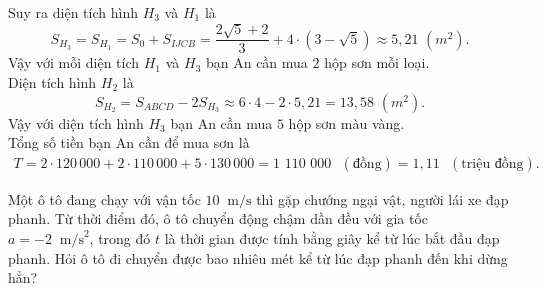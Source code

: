\begin{bt}
{		Suy ra diện tích  hình $H_3$ và $H_1$ là\\
		 $$S_{H_3}=S_{H_1}=S_0+S_{IJCB}=\dfrac{2\sqrt{5}+2}{3}+4\cdot \left(3-\sqrt{5} \right)\approx 5{,}21\,\,(m^2).$$
		Vậy với mỗi diện tích $H_1$  và $H_3$ bạn An cần mua $2$ hộp sơn mỗi loại.\\
		Diện tích  hình $H_2$ là
		$$S_{H_2}=S_{ABCD}-2S_{H_3}\approx 6\cdot4-2\cdot 5{,}21=13{,}58\,\,(m^2).$$ 
		Vậy với diện tích hình $H_3$ bạn An cần mua  $5$ hộp sơn màu vàng.\\
		Tổng số tiền bạn An cần để  mua sơn là
		\begin{align*}
			T=2\cdot 120\,000 + 2\cdot 110\,000 + 5\cdot 130\,000=1\,\,110\,\,000\,\,\,\, (\text{đồng})=1{,}11\,\,\,\, (\text{triệu đồng}). 
		\end{align*}
	 }
\end{bt}

\begin{bt}%
	Một ô tô đang chạy với vận tốc $10~\text{ m/s}$ thì gặp chướng ngại vật, người lái xe đạp phanh. Từ thời điểm đó, ô tô chuyển động chậm dần đều với gia tốc $a=-2~\text{ m/s}^2$, trong đó $t$ là thời gian được tính bằng giây kể từ lúc bắt đầu đạp phanh. Hỏi ô tô đi chuyển được bao nhiêu mét kể từ  lúc đạp phanh đến khi dừng hẳn?
\end{bt}

